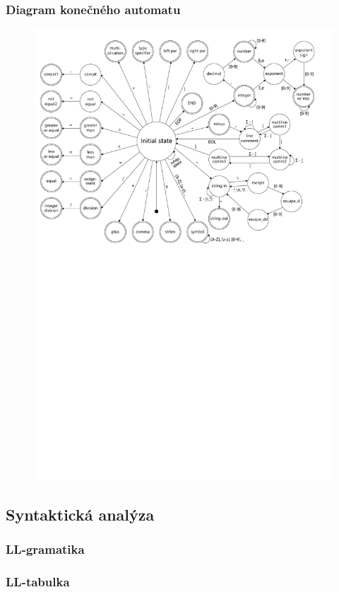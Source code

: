 \documentclass[11pt,a4paper]{article}
\begin{document}
        \subsubsection{Diagram konečného automatu}
        \begin{figure}
            \centering
            \includegraphics[scale=0.37]{images/FSM_v2.pdf}
        \end{figure}
    \subsection{Syntaktická analýza}
        \subsubsection{LL-gramatika}
        \subsubsection{LL-tabulka}
\end{document}
